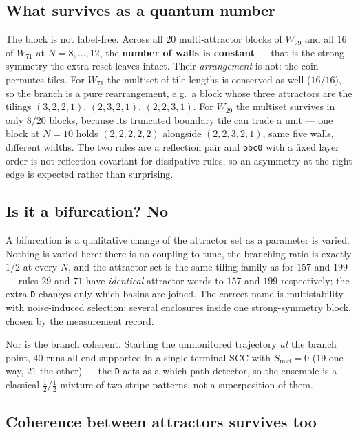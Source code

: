 \documentclass[11pt]{article}
\newcommand{\rt}[1]{\texttt{#1}}
\theoremstyle{plain}
\begin{document}
\subsection{What survives as a quantum number}

The block is not label-free. Across all $20$ multi-attractor blocks of $W_{29}$
and all $16$ of $W_{71}$ at $N=8,\dots,12$, the \textbf{number of walls is
constant} --- that is the strong symmetry the extra reset leaves intact. Their
\emph{arrangement} is not: the coin permutes tiles. For $W_{71}$ the multiset of
tile lengths is conserved as well ($16/16$), so the branch is a pure
rearrangement, e.g.\ a block whose three attractors are the tilings
$(3,2,2,1)$, $(2,3,2,1)$, $(2,2,3,1)$. For $W_{29}$ the multiset survives in only
$8/20$ blocks, because its truncated boundary tile can trade a unit --- one block
at $N=10$ holds $(2,2,2,2,2)$ alongside $(2,2,3,2,1)$, same five walls,
different widths. The two rules are a reflection pair and \rt{obc0} with a fixed
layer order is not reflection-covariant for dissipative rules, so an asymmetry at
the right edge is expected rather than surprising.

\subsection{Is it a bifurcation? No}

A bifurcation is a qualitative change of the attractor set as a parameter is
varied. Nothing is varied here: there is no coupling to tune, the branching ratio
is exactly $1/2$ at every $N$, and the attractor set is the same tiling family as
for $157$ and $199$ --- rules $29$ and $71$ have \emph{identical} attractor words
to $157$ and $199$ respectively; the extra \rt{D} changes only which basins are
joined. The correct name is multistability with noise-induced selection: several
enclosures inside one strong-symmetry block, chosen by the measurement record.

Nor is the branch coherent. Starting the unmonitored trajectory \emph{at} the
branch point, $40$ runs all end supported in a single terminal SCC with
$S_\mathrm{mid}=0$ ($19$ one way, $21$ the other) --- the \rt{D} acts as a
which-path detector, so the ensemble is a classical $\tfrac12/\tfrac12$ mixture
of two stripe patterns, not a superposition of them.

\subsection{Coherence between attractors survives too}
\end{document}
